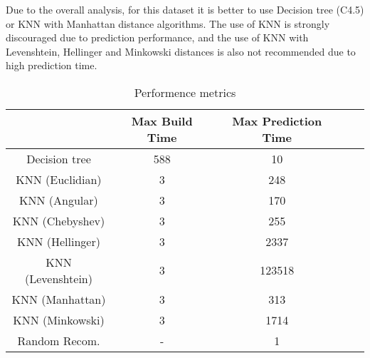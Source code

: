 Due to the overall analysis, for this dataset it is better to use Decision tree (C4.5) or KNN with Manhattan distance algorithms. The use of KNN is strongly discouraged due to prediction performance, and the use of KNN with Levenshtein, Hellinger and Minkowski distances is also not recommended due to high prediction time.

\begin{table}[h]
    \centering
    {\small
    \begin{tabular}{|c|c|c|c|c|}
        \hline
            & Max Build Time & Max Prediction Time \\        
        \hline
        Decision tree       & 588 & 10\\
        \hline
        KNN (Euclidian)     & 3 & 248\\
        \hline
        KNN (Angular)       & 3 & 170\\
        \hline
        KNN (Chebyshev)     & 3 & 255\\
        \hline
        KNN (Hellinger)     & 3 & 2337\\
        \hline
        KNN (Levenshtein)   & 3 & 123518\\
        \hline
        KNN (Manhattan)     & 3 & 313\\
        \hline
        KNN (Minkowski)     & 3 & 1714\\
        \hline
        Random Recom.       & - & 1\\
        \hline
    \end{tabular}
    }
    \caption{Performence metrics}\label{tab:analysis_performence}
\end{table}